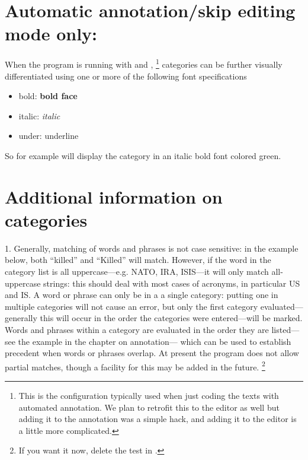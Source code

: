 \documentclass[letterpaper,10pt,english]{sphinxmanual}
\begin{document}
\section{Automatic annotation/skip editing mode only:}
\label{workspaces:automatic-annotation-skip-editing-mode-only}
When the program is running with  and
, \footnote{
This is the configuration typically used when just coding the texts
with automated annotation. We plan to retrofit this to the editor
as well but adding it to the annotation was a simple hack, and adding
it to the editor is a little more complicated.
} categories can be further visually differentiated using
one or more of the following font specifications
\begin{itemize}
\item {} 
bold: \textbf{bold face}

\item {} 
italic: \emph{italic}

\item {} 
under: underline

\end{itemize}

So for example  will display the category in an
italic bold font colored green.


\section{Additional information on categories}
\label{workspaces:additional-information-on-categories}
1. Generally, matching of words and phrases is not case sensitive: in
the example below, both ``killed'' and ``Killed'' will match. However, if the
word in the category list is all uppercase—e.g. NATO, IRA, ISIS—it will
only match all-uppercase strings: this should deal with most cases of
acronyms, in particular US and IS. A word or
phrase can only be in a a single category: putting one in multiple
categories will not cause an error, but only the first category
evaluated—generally this will occur in the order the categories were
entered—will be marked. Words and phrases within a category are
evaluated in the order they are listed—see the example in the chapter on annotation—
which can be used to establish precedent when words or
phrases overlap. At present the program does not allow partial matches,
though a facility for this may be added in the future. \footnote{
If you want it now, delete the test  in
.
}
\end{document}
